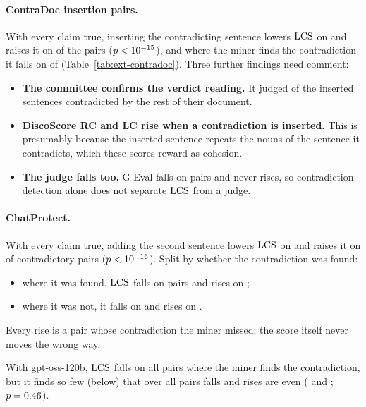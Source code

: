 \paragraph{ContraDoc insertion pairs.} With every claim true, inserting the contradicting
sentence lowers $\mathrm{LCS}$ on \extCdAssertDecGpt{} and raises it on \extCdAssertIncGpt{} of the
\extCdPairs{} pairs ($p<10^{-15}$), and where the miner finds the contradiction it falls
on \extCdAssertEdgeDecGpt{} of \extCdAssertEdgeNGpt{} (Table~\ref{tab:ext-contradoc}). Three further
findings need comment:
\begin{itemize}[leftmargin=1.2em,itemsep=1pt,topsep=2pt]
\item \textbf{The committee confirms the verdict reading.} It judged \extCdSpotContradicted{} of
  the \extCdPairs{} inserted sentences contradicted by the rest of their document.
\item \textbf{DiscoScore RC and LC rise when a contradiction is inserted.} This is presumably
  because the inserted sentence repeats the nouns of the sentence it contradicts, which these
  scores reward as cohesion.
\item \textbf{The judge falls too.} G-Eval falls on \extCdJudgeDec{} pairs and never rises, so
  contradiction detection alone does not separate $\mathrm{LCS}$ from a judge.
\end{itemize}
\paragraph{ChatProtect.} With every claim true, adding the second sentence lowers $\mathrm{LCS}$ on \extCpAssertDecGpt{} and raises it on
\extCpAssertIncGpt{} of \extCpAssertNGpt{} contradictory pairs ($p<10^{-16}$). Split by whether
the contradiction was found:
\begin{itemize}[leftmargin=1.2em,itemsep=1pt,topsep=2pt]
\item where it was found, $\mathrm{LCS}$ falls on \extCpFoundFallGpt{} pairs and rises on
  \extCpFoundRiseGpt;
\item where it was not, it falls on \extCpNotFoundFallGpt{} and rises on \extCpNotFoundRiseGpt.
\end{itemize}
Every rise is a pair whose contradiction the miner missed; the score itself never moves the wrong
way.

With gpt-oss-120b, $\mathrm{LCS}$ falls on all \extCpFoundFallOss{} pairs where the miner finds the
contradiction, but it finds so few (below) that over all pairs falls and
rises are even (\extCpAssertDecOss{} and \extCpAssertIncOss; $p=0.46$).

